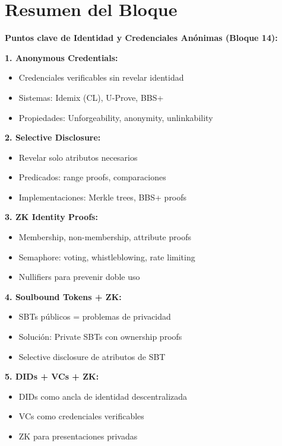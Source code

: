 \documentclass[11pt,a4paper,twoside]{book}
\theoremstyle{definition}
\theoremstyle{remark}
\begin{document}
\section*{Resumen del Bloque}

\begin{keyidea}
\textbf{Puntos clave de Identidad y Credenciales Anónimas (Bloque 14):}

\textbf{1. Anonymous Credentials:}
\begin{itemize}
    \item Credenciales verificables sin revelar identidad
    \item Sistemas: Idemix (CL), U-Prove, BBS+
    \item Propiedades: Unforgeability, anonymity, unlinkability
\end{itemize}

\textbf{2. Selective Disclosure:}
\begin{itemize}
    \item Revelar solo atributos necesarios
    \item Predicados: range proofs, comparaciones
    \item Implementaciones: Merkle trees, BBS+ proofs
\end{itemize}

\textbf{3. ZK Identity Proofs:}
\begin{itemize}
    \item Membership, non-membership, attribute proofs
    \item Semaphore: voting, whistleblowing, rate limiting
    \item Nullifiers para prevenir doble uso
\end{itemize}

\textbf{4. Soulbound Tokens + ZK:}
\begin{itemize}
    \item SBTs públicos = problemas de privacidad
    \item Solución: Private SBTs con ownership proofs
    \item Selective disclosure de atributos de SBT
\end{itemize}

\textbf{5. DIDs + VCs + ZK:}
\begin{itemize}
    \item DIDs como ancla de identidad descentralizada
    \item VCs como credenciales verificables
    \item ZK para presentaciones privadas
\end{itemize}


\end{keyidea}
\end{document}
